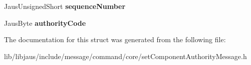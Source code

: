 \begin{DoxyCompactItemize}
\item 
\hypertarget{struct_set_component_authority_message_struct_a529b473b3ea2c20182dfb0d1733c44ff}{\-Jaus\-Unsigned\-Short {\bfseries sequence\-Number}}\label{struct_set_component_authority_message_struct_a529b473b3ea2c20182dfb0d1733c44ff}

\item 
\hypertarget{struct_set_component_authority_message_struct_a5f7029988e1760fc7aa2a8d7f8844f72}{\-Jaus\-Byte {\bfseries authority\-Code}}\label{struct_set_component_authority_message_struct_a5f7029988e1760fc7aa2a8d7f8844f72}

\end{DoxyCompactItemize}


\-The documentation for this struct was generated from the following file\-:\begin{DoxyCompactItemize}
\item 
lib/libjaus/include/message/command/core/set\-Component\-Authority\-Message.\-h\end{DoxyCompactItemize}
